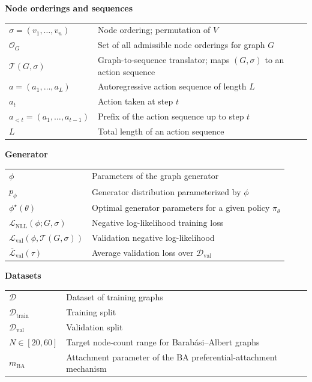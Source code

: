 \documentclass[12pt,a4paper,oneside]{report}
\begin{document}
\noindent\textbf{Node orderings and sequences}
\begin{longtable}{p{3.8cm}p{10.2cm}}
$\sigma=(v_1,\ldots,v_n)$  & Node ordering; permutation of $V$ \\
$\mathcal{O}_G$            & Set of all admissible node orderings for graph $G$ \\
$\mathcal{T}(G,\sigma)$    & Graph-to-sequence translator; maps $(G,\sigma)$ to an action sequence \\
$a=(a_1,\ldots,a_L)$       & Autoregressive action sequence of length $L$ \\
$a_t$                      & Action taken at step $t$ \\
$a_{<t}=(a_1,\ldots,a_{t-1})$ & Prefix of the action sequence up to step $t$ \\
$L$                        & Total length of an action sequence \\
\end{longtable}

\noindent\textbf{Generator}
\begin{longtable}{p{3.8cm}p{10.2cm}}
$\phi$                       & Parameters of the graph generator \\
$p_\phi$                     & Generator distribution parameterized by $\phi$ \\
$\phi^\star(\theta)$         & Optimal generator parameters for a given policy $\pi_\theta$ \\
$\mathcal{L}_{\mathrm{NLL}}(\phi;G,\sigma)$ & Negative log-likelihood training loss \\
$\mathcal{L}_{\mathrm{val}}(\phi,\mathcal{T}(G,\sigma))$ & Validation negative log-likelihood \\
$\overline{\mathcal{L}}_{\mathrm{val}}(\tau)$ & Average validation loss over $\mathcal{D}_{\mathrm{val}}$ \\
\end{longtable}

\noindent\textbf{Datasets}
\begin{longtable}{p{3.8cm}p{10.2cm}}
$\mathcal{D}$              & Dataset of training graphs \\
$\mathcal{D}_{\mathrm{train}}$ & Training split \\
$\mathcal{D}_{\mathrm{val}}$   & Validation split \\
$N\in[20,60]$              & Target node-count range for Barab\'asi--Albert graphs \\
$m_{\mathrm{BA}}$          & Attachment parameter of the BA preferential-attachment mechanism \\
\end{longtable}
\end{document}
